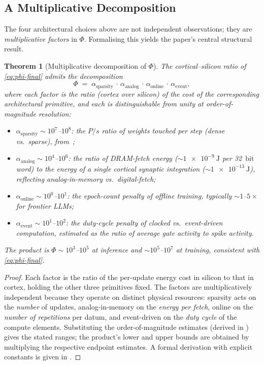 \documentclass[11pt]{article}
\providecommand{\joule}{\ensuremath{\mathrm{J}}}
\providecommand{\bit}{\ensuremath{\mathrm{bit}}}
\newtheorem{theorem}{Theorem}
\theoremstyle{definition}
\theoremstyle{remark}
\begin{document}
\subsection{A Multiplicative Decomposition}
\label{sec:decomp}

The four architectural choices above are not independent
observations; they are \emph{multiplicative factors} in $\Phi$.
Formalising this yields the paper's central structural result.

\begin{theorem}[Multiplicative decomposition of $\Phi$]
\label{thm:decomp}
The cortical--silicon ratio of \cref{eq:phi-final} admits the
decomposition
\begin{equation}
  \Phi \;=\; \alpha_{\mathrm{sparsity}}\,\cdot\,\alpha_{\mathrm{analog}}\,\cdot\,\alpha_{\mathrm{online}}\,\cdot\,\alpha_{\mathrm{event}},
  \label{eq:decomp}
\end{equation}
where each factor is the ratio (cortex over silicon) of the cost of
the corresponding architectural primitive, and each is
distinguishable from unity at order-of-magnitude resolution:
\begin{itemize}[leftmargin=*,topsep=2pt,itemsep=1pt]
\item $\alpha_{\mathrm{sparsity}} \sim 10^{7}$--$10^{8}$: the
  $P/s$ ratio of weights touched per step (dense vs.\ sparse),
  from~;
\item $\alpha_{\mathrm{analog}} \sim 10^{4}$--$10^{6}$: the ratio of
  DRAM-fetch energy ($\sim\!\SI{1e-9}{\joule}$ per \SI{32}{\bit}
  word) to the energy of a single cortical synaptic integration
  ($\sim\!\SI{1e-13}{\joule}$), reflecting analog-in-memory vs.\
  digital-fetch;
\item $\alpha_{\mathrm{online}} \sim 10^{0}$--$10^{1}$: the
  epoch-count penalty of offline training, typically
  $\sim\!1$--$5\times$ for frontier LLMs;
\item $\alpha_{\mathrm{event}} \sim 10^{1}$--$10^{2}$: the duty-cycle
  penalty of clocked vs.\ event-driven computation, estimated as the
  ratio of average gate activity to spike activity.
\end{itemize}
The product is $\Phi\sim 10^{3}$--$10^{5}$ at inference and
$\sim\!10^{5}$--$10^{7}$ at training, consistent with
\cref{eq:phi-final}.
\end{theorem}

\begin{proof}
Each factor is the ratio of the per-update energy cost in silicon to
that in cortex, holding the other three primitives fixed.  The
factors are multiplicatively independent because they operate on
distinct physical resources: sparsity acts on the \emph{number} of
updates, analog-in-memory on the \emph{energy per fetch}, online on
the \emph{number of repetitions} per datum, and event-driven on the
\emph{duty cycle} of the compute elements.  Substituting the
order-of-magnitude estimates (derived in
) gives the stated ranges; the
product's lower and upper bounds are obtained by multiplying the
respective endpoint estimates.  A formal derivation with explicit
constants is given in \Cref{app:decomp}.
\end{proof}
\end{document}

